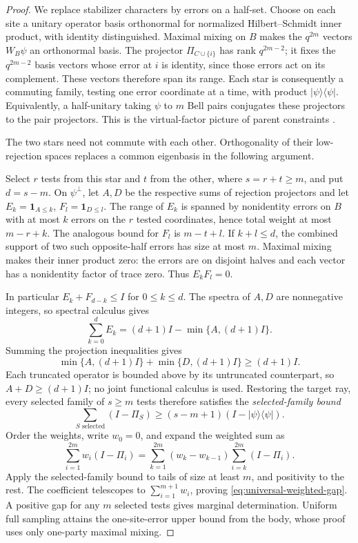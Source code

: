 \begin{proof}
We replace stabilizer characters by errors on a half-set.  Choose on each
site a unitary operator basis orthonormal for normalized Hilbert--Schmidt
inner product, with identity distinguished.  Maximal mixing on \(B\)
makes the \(q^{2m}\) vectors \(W_B\psi\) an orthonormal basis.  The
projector \(\Pi_{C\cup\{i\}}\) has rank \(q^{2m-2}\); it fixes the
\(q^{2m-2}\) basis vectors whose error at \(i\) is identity, since those
errors act on its complement.  These vectors therefore span its range.
Each star is consequently a commuting family, testing one error coordinate
at a time, with product \(|\psi\rangle\langle\psi|\).
Equivalently, a half-unitary taking \(\psi\) to \(m\) Bell pairs
conjugates these projectors to the pair projectors.  This is the
virtual-factor picture of parent constraints
\cite[Sections~IV--V]{JohnsonTicozziViola2017}
\cite[Sections~2 and~5]{KaruvadeJohnsonTicozziViola2018}.

The two stars need not commute with each other.  Orthogonality of their
low-rejection spaces replaces a common eigenbasis in the following argument.

Select \(r\) tests from this star and \(t\) from the other, where
\(s=r+t\geq m\), and put \(d=s-m\).  On \(\psi^\perp\), let \(A,D\)
be the respective sums of rejection projectors and let
\(E_k=\mathbf1_{A\leq k}\), \(F_l=\mathbf1_{D\leq l}\).
The range of \(E_k\) is spanned by nonidentity errors on \(B\) with at
most \(k\) errors on the \(r\) tested coordinates, hence total weight at
most \(m-r+k\).  The analogous bound for \(F_l\) is \(m-t+l\).
If \(k+l\leq d\), the combined support of two such opposite-half errors
has size at most \(m\).  Maximal mixing makes their inner product zero:
the errors are on disjoint halves and each vector has a nonidentity factor
of trace zero.  Thus \(E_kF_l=0\).

In particular \(E_k+F_{d-k}\leq I\) for \(0\leq k\leq d\).
The spectra of \(A,D\) are nonnegative integers, so spectral calculus gives
\[
 \sum_{k=0}^d E_k=(d+1)I-\min\{A,(d+1)I\}.
\]
Summing the projection inequalities gives
\[
 \min\{A,(d+1)I\}+\min\{D,(d+1)I\}\geq(d+1)I.
\]
Each truncated operator is bounded above by its untruncated counterpart,
so \(A+D\geq(d+1)I\); no joint functional calculus is used.
Restoring the target ray, every selected family of \(s\geq m\) tests
therefore satisfies the \emph{selected-family bound}
\begin{equation}
 \sum_{S\text{ selected}}(I-\Pi_S)
       \geq(s-m+1)(I-|\psi\rangle\langle\psi|).
 \label{eq:selected-family-verification}
\end{equation}
Order the weights, write \(w_0=0\), and expand the weighted sum as
\[
 \sum_{i=1}^{2m}w_i(I-\Pi_i)
  =\sum_{k=1}^{2m}(w_k-w_{k-1})
                    \sum_{i=k}^{2m}(I-\Pi_i).
\]
Apply the selected-family bound to tails of size at least \(m\), and
positivity to the rest.  The coefficient telescopes to
\(\sum_{i=1}^{m+1}w_i\), proving \eqref{eq:universal-weighted-gap}.
A positive gap for any \(m\) selected tests gives marginal determination.
Uniform full sampling attains the one-site-error upper bound from the body,
whose proof uses only one-party maximal mixing.
\end{proof}
